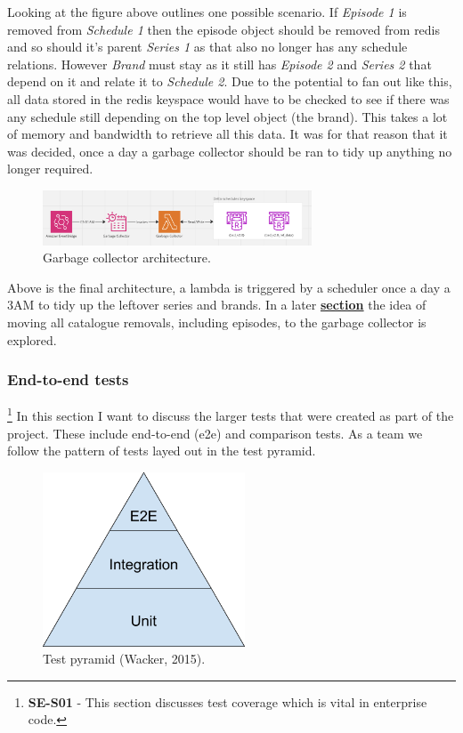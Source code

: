   Looking at the figure above outlines one possible scenario. If \emph{Episode 1} is removed from \emph{Schedule 1} then the episode object should be removed
  from redis and so should it's parent \emph{Series 1} as that also no longer has any schedule relations. However \emph{Brand} must stay as it still
  has \emph{Episode 2} and \emph{Series 2} that depend on it and relate it to \emph{Schedule 2}. Due to the potential to fan out like this, all data stored
  in the redis keyspace would have to be checked to see if there was any schedule still depending on the top level object (the brand). This takes a lot of
  memory and bandwidth to retrieve all this data. It was for that reason that it was decided, once a day a garbage collector should be ran to 
  tidy up anything no longer required.

  \begin{figure}[H]
    \centering
    \includegraphics[width=8cm]{assets/architectures/garbageCollector.png}
    \caption{Garbage collector architecture.}
    \label{fig:garbageCollectorArchitecture}
  \end{figure}

  Above is the final architecture, a lambda is triggered by a scheduler once a day a 3AM to tidy up the leftover series and brands. In a later
  \hyperref[sec:garbageCollectorConsolidation]{\textbf{section}} the idea of moving all catalogue removals, including episodes, to the garbage 
  collector is explored.

  \newpage
  \subsubsection{End-to-end tests}
  \footnote{\textbf{SE-S01} - This section discusses test coverage which is vital in enterprise code.}
  In this section I want to discuss the larger tests that were created as part of the project. These include end-to-end (e2e) and comparison tests.
  As a team we follow the pattern of tests layed out in the test pyramid.

  \begin{figure}[H]
    \centering
    \includegraphics[width=6cm]{assets/testPyramid.png}
    \caption{Test pyramid (Wacker, 2015).}
    \label{fig:testPyramid}
  \end{figure}

